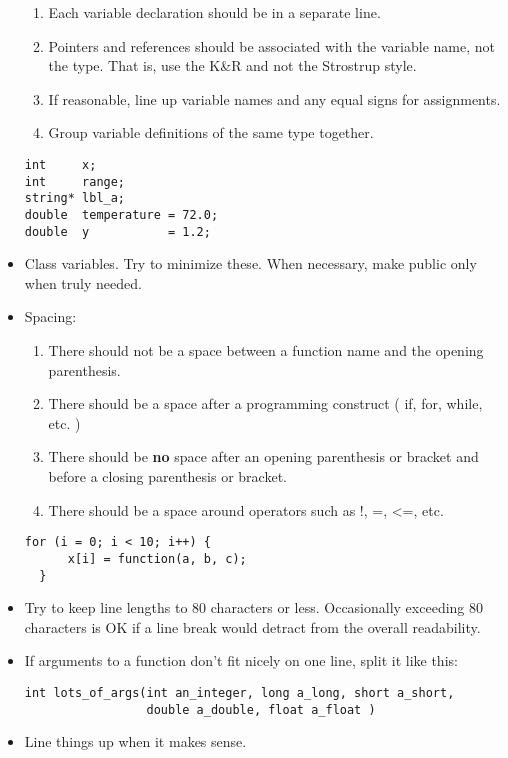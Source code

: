 \begin{itemize}
\begin{enumerate}
   \item Each variable declaration should be in a separate line.
   \item Pointers and references should be associated with the variable name, not the type. That is, use the K\&R and not the Strostrup style.
   \item If reasonable, line up variable names and any equal signs for assignments.
   \item Group variable definitions of the same type together.
 \end{enumerate}
 \begin{lstlisting}[style=C++]
int     x;
int     range;
string* lbl_a;
double  temperature = 72.0;
double  y           = 1.2;
\end{lstlisting}
 \item Class variables. Try to minimize these. When necessary, make public only when truly needed. 
 \item Spacing:
 \begin{enumerate}
   \item There should not be a space between a function name and the opening parenthesis.
   \item There should be a space after a programming construct ( if, for, while, etc. )
   \item There should be \textbf{no} space after an opening parenthesis or bracket and before a closing parenthesis or bracket.
   \item There should be a space around operators such as !, =, <=, etc.
 \end{enumerate}
 \begin{lstlisting}[style=C++]
for (i = 0; i < 10; i++) {
      x[i] = function(a, b, c);    
  }
 \end{lstlisting}
 \item Try to keep line lengths to 80 characters or less. Occasionally exceeding 80 characters is OK if a line break would detract from the overall readability.
 \item If arguments to a function don't fit nicely on one line, split it like this:
 \begin{lstlisting}[style=C++]
int lots_of_args(int an_integer, long a_long, short a_short,
                 double a_double, float a_float )
 \end{lstlisting}
 \item Line things up when it makes sense.
\end{itemize}






